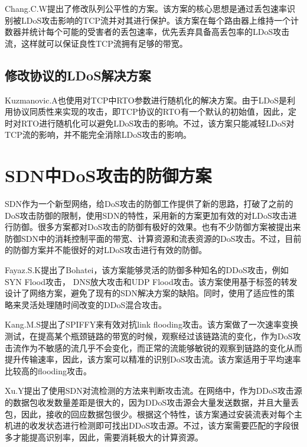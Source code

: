 Chang.C.W\cite{b8}提出了修改队列公平性的方案。该方案的核心思想是通过丢包速率识别被LDoS攻击影响的TCP流并对其进行保护。该方案在每个路由器上维持一个计数器并统计每个可能的受害者的丢包速率，优先丢弃具备高丢包率的LDoS攻击流，这样就可以保证良性TCP流拥有足够的带宽。


\subsection{修改协议的LDoS解决方案}
\label{chap2:promodify}
Kuzmanovic.A\cite{Kuzmanovic2006Low}也使用对TCP中RTO参数进行随机化的解决方案。由于LDoS是利用协议同质性来实现的攻击，即TCP协议的RTO有一个默认的初始值，因此，定时对RTO进行随机化可以避免LDoS攻击的影响。不过，该方案只能减轻LDoS对TCP流的影响，并不能完全消除LDoS攻击的影响。




\section{SDN中DoS攻击的防御方案}
SDN作为一个新型网络，给DoS攻击的防御工作提供了新的思路，打破了之前的DoS攻击防御的限制，使用SDN的特性，采用新的方案更加有效的对LDoS攻击进行防御。很多方案\cite{b9, b16, b10}都对DoS攻击的防御有极好的效果。也有不少防御方案\cite{b10, b12, b13, b15, b18,wang2015floodguard,zhang2017ftguard}被提出来防御SDN中的消耗控制平面的带宽、计算资源和流表资源的DoS攻击\cite{shin2013avant,cao2017disrupting}。不过，目前的防御方案并不能很好的对LDoS攻击进行有效的防御。


Fayaz.S.K\cite{b9}提出了Bohatei，该方案能够灵活的防御多种知名的DDoS攻击，例如SYN Flood攻击， DNS放大攻击和UDP Flood攻击。该方案使用基于标签的转发设计了网络方案，避免了现有的SDN解决方案的缺陷。同时，使用了适应性的策略来灵活处理随时间改变的DDoS混合攻击。

Kang.M.S\cite{b16}提出了SPIFFY来有效对抗link flooding攻击。该方案做了一次速率变换测试，在提高某个瓶颈链路的带宽的时候，观察经过该链路流的变化，作为DoS攻击流作为不敏感的流几乎不会变化，而正常的流能够敏锐的观察到链路的变化从而提升传输速率，因此，该方案可以精准的识别DoS攻击流。该方案适用于平均速率比较高的flooding攻击。

Xu.Y\cite{b10}提出了使用SDN对流检测的方法来判断攻击流。在网络中，作为DDoS攻击源的数据包收发数量差距是很大的，因为DDoS攻击源会大量发送数据，并且大量丢包，因此，接收的回应数据包很少。根据这个特性，该方案通过安装流表对每个主机进的收发状态进行检测即可找出DDoS攻击源。不过，该方案需要匹配的字段很多才能提高识别率，因此，需要消耗极大的计算资源。


